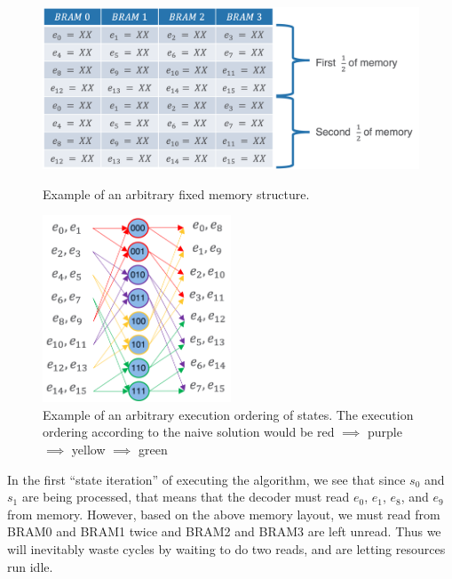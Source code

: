 \begin{figure}
\centering\CaptionFontSize
\includegraphics[height=15em]
{Figures/arb_fixed_mem.png}
\caption[Example of an arbitrary fixed memory structure]
{Example of an arbitrary fixed memory structure.}
\label{Figure:DecoderHW:NaiveMemory}
\end{figure}
\begin{figure}
\centering\CaptionFontSize
\includegraphics[height=15em]
{Figures/arb_state_ordering.png}
\caption[Example of an arbitrary execution ordering of states]
{Example of an arbitrary execution ordering of states. The execution ordering according to the naive solution would be red $\implies$ purple $\implies$ yellow $\implies$ green}
\label{Figure:DecoderHW:NaiveOrdering}
\end{figure}
In the first “state iteration” of executing the algorithm, we see that since $s_0$ and $s_1$ are being processed, that means that the decoder must read $e_0$, $e_1$, $e_8$, and $e_9$ from memory. However, based on the above memory layout, we must read from BRAM0 and BRAM1 twice and BRAM2 and BRAM3 are left unread. Thus we will inevitably waste cycles by waiting to do two reads, and are letting resources run idle.

